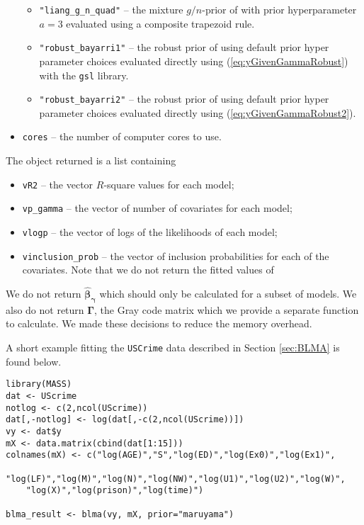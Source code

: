 \documentclass[12pt]{article}
\def\vectorfonttwo{\boldsymbol}
\def\vbeta{{\vectorfonttwo \beta}}               %
\def\vgamma{{\vectorfonttwo \gamma}}             %
\def\matrixfonttwo{\boldsymbol}
\def\mGamma{{\matrixfonttwo \Gamma}}             %
\begin{document}
\begin{itemize}
\begin{itemize}
		\item {\tt "liang\_g\_n\_quad"} -- the mixture $g/n$-prior of \cite{Liang2008} with prior hyperparameter $a=3$ evaluated using a composite trapezoid rule.
		
		\item {\tt "robust\_bayarri1"} -- the robust prior of \cite{Bayarri2012}
		using default prior hyper parameter choices evaluated directly using 
		(\ref{eq:yGivenGammaRobust}) with the {\tt gsl} library.
		
		\item {\tt "robust\_bayarri2"} -- the robust prior of \cite{Bayarri2012}
		using default prior hyper parameter choices evaluated directly using 
		(\ref{eq:yGivenGammaRobust2}).
	
	\end{itemize}

	\item {\tt cores} -- the number of computer cores to use.
\end{itemize}

\noindent 
The object returned is a list containing
\begin{itemize}
\item {\tt vR2} -- the vector $R$-square values for each model; 
\item {\tt vp\_gamma} -- the vector of number of covariates for each model;
\item {\tt vlogp} -- the vector of logs of the likelihoods of each model; 
\item {\tt vinclusion\_prob} -- the vector of inclusion probabilities for each of the covariates. Note that we do not return the fitted values of 
\end{itemize}
We do not return $\widehat{\vbeta}_{\vgamma}$ which should only be calculated for a subset of models. We also
do not return $\mGamma$, the Gray code matrix which we provide a separate function to calculate. We made these
decisions to reduce the memory overhead.

A short example fitting the {\tt USCrime} data described in Section 
\ref{sec:BLMA} is found below.

\begin{verbatim}
library(MASS)
dat <- UScrime
notlog <- c(2,ncol(UScrime))
dat[,-notlog] <- log(dat[,-c(2,ncol(UScrime))])
vy <- dat$y
mX <- data.matrix(cbind(dat[1:15]))
colnames(mX) <- c("log(AGE)","S","log(ED)","log(Ex0)","log(Ex1)",
    "log(LF)","log(M)","log(N)","log(NW)","log(U1)","log(U2)","log(W)",
    "log(X)","log(prison)","log(time)") 

blma_result <- blma(vy, mX, prior="maruyama")
\end{verbatim}
\end{document}
